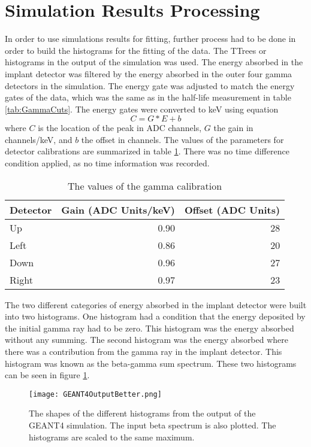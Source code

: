 \documentclass[../MaxHughesThesis.tex]{subfiles}
\begin{document}
\section{Simulation Results Processing}
In order to use simulations results for fitting, further process had to be done in order to build the histograms for the fitting of the data.
The TTrees or histograms in the output of the simulation was used.
The energy absorbed in the implant detector was filtered by the energy absorbed in the outer four gamma detectors in the simulation.
The energy gate was adjusted to match the energy gates of the data, which was the same as in the half-life measurement in table \ref{tab:GammaCuts}.
The energy gates were converted to keV using equation
\begin{equation}
        C = G * E + b
        \label{eq:cal}
\end{equation}
where $C$ is the location of the peak in ADC channels, $G$ the gain in channels/keV, and $b$ the offset in channels.
The values of the parameters for detector calibrations are summarized in table \ref{tab:gammadetcal}.
There was no time difference condition applied, as no time information was recorded.

\begin{table}[!hbt]
        \centering
        \caption{The values of the gamma calibration}
                \begin{tabular}{lrr}
                Detector & Gain (ADC Units/keV) & Offset (ADC Units) \\ \hline
                Up & 0.90 & 28 \\
                Left & 0.86 & 20 \\
                Down & 0.96 & 27 \\
                Right & 0.97 & 23
                \end{tabular}
                \label{tab:gammadetcal}
\end{table}
The two different categories of energy absorbed in the implant detector were built into two histograms.
One histogram had a condition that the energy deposited by the initial gamma ray had to be zero.
This histogram was the energy absorbed without any summing.
The second histogram was the energy absorbed where there was a contribution from the gamma ray in the implant detector.
This histogram was known as the beta-gamma sum spectrum.
These two histograms can be seen in figure \ref{fig:GEANT4Hists}.
\begin{figure}[!htb]
        \centerline{\texttt{[image: GEANT4OutputBetter.png]}}
        \caption{The shapes of the different histograms from the output of the GEANT4 simulation.
                 The input beta spectrum is also plotted.
                 The histograms are scaled to the same maximum.}
        \label{fig:GEANT4Hists}
\end{figure}
\end{document}
